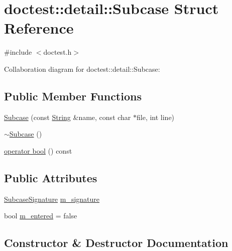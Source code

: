 \hypertarget{structdoctest_1_1detail_1_1_subcase}{}\section{doctest\+:\+:detail\+:\+:Subcase Struct Reference}
\label{structdoctest_1_1detail_1_1_subcase}


{\ttfamily \#include $<$doctest.\+h$>$}



Collaboration diagram for doctest\+:\+:detail\+:\+:Subcase\+:
\subsection*{Public Member Functions}
\begin{DoxyCompactItemize}
\item 
\hyperlink{structdoctest_1_1detail_1_1_subcase_a8f7d4a5ddfb8ae48663e5cfc786e6f12}{Subcase} (const \hyperlink{classdoctest_1_1_string}{String} \&name, const char $\ast$file, int line)
\item 
\hyperlink{structdoctest_1_1detail_1_1_subcase_a4812988371d226236be53c302c86abe2}{$\sim$\+Subcase} ()
\item 
\hyperlink{structdoctest_1_1detail_1_1_subcase_a91a520769fc55fb5be781f949ef3200f}{operator bool} () const
\end{DoxyCompactItemize}
\subsection*{Public Attributes}
\begin{DoxyCompactItemize}
\item 
\hyperlink{structdoctest_1_1_subcase_signature}{Subcase\+Signature} \hyperlink{structdoctest_1_1detail_1_1_subcase_a54730e9b88cf33ea4a5c873164029202}{m\+\_\+signature}
\item 
bool \hyperlink{structdoctest_1_1detail_1_1_subcase_acb703ee6e769f56fba4053447c1a36e4}{m\+\_\+entered} = false
\end{DoxyCompactItemize}


\subsection{Constructor \& Destructor Documentation}
\mbox{\label{structdoctest_1_1detail_1_1_subcase_a8f7d4a5ddfb8ae48663e5cfc786e6f12}} 
